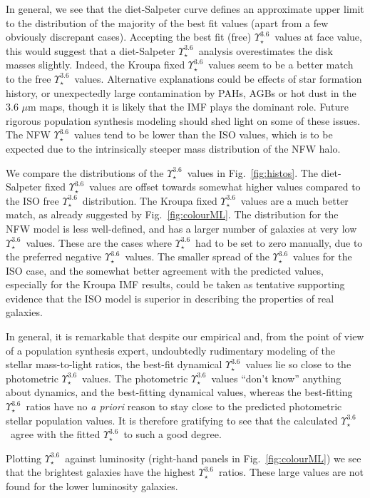 \documentclass[usenatbib,usegraphicx,apjfonts,floatfix]{emulateapj}
\newcommand{\Ups}{\ensuremath{\Upsilon_{\star}^{3.6}}}
\begin{document}
In general, we see that the diet-Salpeter curve defines an approximate
upper limit to the distribution of the majority of the best fit values
(apart from a few obviously discrepant cases).  Accepting the best fit
(free) \Ups\ values at face value, this would suggest that a
diet-Salpeter \Ups\ analysis overestimates the disk masses slightly.
Indeed, the Kroupa fixed \Ups\ values seem to be a better match to the
free \Ups\ values.  Alternative explanations could be effects of star
formation history, or unexpectedly large contamination by PAHs, AGBs
or hot dust in the 3.6 $\mu$m maps, though it is likely that the IMF
plays the dominant role.  Future rigorous population synthesis
modeling should shed light on some of these issues. The NFW \Ups\
values tend to be lower than the ISO values, which is to be expected
due to the intrinsically steeper mass distribution of the NFW halo.

We compare the distributions of the \Ups\ values in
Fig.~\ref{fig:histos}.  The diet-Salpeter fixed \Ups\ values are
offset towards somewhat higher values compared to the ISO free \Ups\
distribution. The Kroupa fixed \Ups\ values are a much better match,
as already suggested by Fig.~\ref{fig:colourML}.  The distribution for
the NFW model is less well-defined, and has a larger number of
galaxies at very low \Ups\ values.  These are the cases where \Ups\
had to be set to zero manually, due to the preferred negative \Ups\
values.  The smaller spread of the \Ups\ values for the ISO case, and
the somewhat better agreement with the predicted values, especially
for the Kroupa IMF results, could be taken as tentative supporting
evidence that the ISO model is superior in describing the properties
of real galaxies.

In general, it is remarkable that despite our empirical and, from the
point of view of a population synthesis expert, undoubtedly
rudimentary modeling of the stellar mass-to-light ratios, the best-fit
dynamical \Ups\ values lie so close to the photometric \Ups\ values.
The photometric \Ups\ values ``don't know'' anything about dynamics,
and the best-fitting dynamical values, whereas the best-fitting \Ups\
ratios have no \emph{a priori} reason to stay close to the predicted
photometric stellar population values. It is therefore gratifying to
see that the calculated \Ups\ agree with the fitted \Ups\ to such a
good degree.

Plotting \Ups\ against luminosity (right-hand panels in
Fig.~\ref{fig:colourML}) we see that the brightest galaxies have the
highest \Ups\ ratios.  These large values are not found for the lower
luminosity galaxies.
\end{document}
